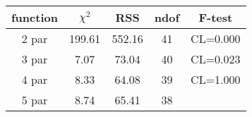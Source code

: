 \begin{tabular}{c|c|c|c|c}
function & $\chi^2$ & RSS & ndof & F-test \\
\hline
2 par & 199.61 & 552.16 & 41 & CL=0.000 \\
3 par & 7.07 & 73.04 & 40 & CL=0.023 \\
4 par & 8.33 & 64.08 & 39 & CL=1.000 \\
5 par & 8.74 & 65.41 & 38 & \\
\hline
\end{tabular}